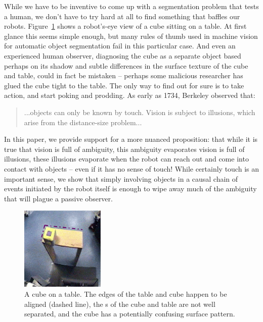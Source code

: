 While we have to be inventive to come up with a segmentation problem
that tests a human, we don't have to try hard at all to find something
that baffles our robots.  Figure~\ref{fig:setup-sequence} shows a
robot's-eye view of a cube sitting on a table. At first glance this
seems simple enough, but many rules of thumb used in machine vision
for automatic object segmentation fail in this particular case.  And
even an experienced human observer, diagnosing the cube as a separate
object based perhaps on its shadow and subtle differences in the
surface texture of the cube and table, could in fact be mistaken --
perhaps some malicious researcher has glued the cube tight to the table.  The only way to
find out for sure is to take action, and start poking and prodding.
As early as 1734, Berkeley observed that:
%
\begin{quote}
...objects can only be known by
touch. Vision is subject to illusions, which arise from the
distance-size problem... \cite{berkeley72new}
\end{quote}
%
In this paper, we provide support for a more nuanced proposition: that
while it is true that 
\ifrevised
vision is full of ambiguity, this ambiguity evaporates
\else
vision is full of illusions, these illusions evaporate 
\fi
when the robot can reach out and come into contact with
objects -- even if it has no sense of touch!  While certainly touch is
an important sense, we show that simply involving objects in a causal
chain of events initiated by the robot itself is enough to wipe away much
of the ambiguity that will plague a passive observer.

%
\begin{figure}[tbh]
\begin{center}
\includegraphics[width=4cm]{setup-sequence.eps}
\caption{ 
\label{fig:setup-sequence}
%
A cube on a table. The edges of the table and cube happen to be
aligned (dashed line), the \ahhcolor{}s of the cube and table are not well
separated, and the cube has a potentially confusing surface pattern.
%
}
\end{center}
\end{figure}


